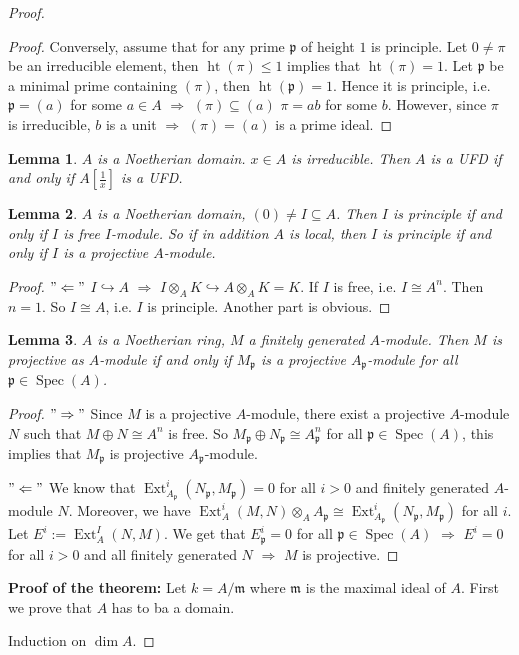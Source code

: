 \documentclass[cs4size]{article}
\newcommand{\su}{\subseteq}
\newcommand{\frm}{\mathfrak{m}}
\newcommand{\frp}{\mathfrak{p}}
\newcommand{\Ra}{\Rightarrow}
\DeclareMathOperator{\Ext}{Ext}
\DeclareMathOperator{\Spec}{Spec}
\DeclareMathOperator{\height}{ht}
\newtheorem{lem}{Lemma}
\begin{document}
\begin{proof}
\begin{proof}
Conversely, assume that for any prime $\frp$ of height $1$ is principle. Let $0\neq\pi$ be an irreducible element, then $\height(\pi)\leq 1$ implies that $\height(\pi)=1$. Let $\frp$ be a minimal prime containing $(\pi)$, then $\height(\frp)=1$. Hence it is principle, i.e. $\frp=(a)$ for some $a\in A$ $\Ra$ $(\pi)\su(a)$ $\pi=ab$ for some $b$. However, since $\pi$ is irreducible, $b$ is a unit $\Ra$ $(\pi)=(a)$ is a prime ideal.
\end{proof}
\begin{lem}\label{lem:E}
$A$ is a Noetherian domain. $x\in A$ is irreducible. Then $A$ is a UFD if and only if $A[\frac{1}{x}]$ is a UFD.
\end{lem}
\begin{lem}\label{lem:F}
$A$ is a Noetherian domain, $(0)\neq I\su A$. Then $I$ is principle if and only if $I$ is free $I$-module. So if in addition $A$ is local, then $I$ is principle if and only if $I$ is a projective $A$-module.
\end{lem}
\begin{proof}
$"\Leftarrow"$ $I\hookrightarrow A$ $\Ra$ $I\otimes_AK\hookrightarrow A\otimes_AK=K$. If $I$ is free, i.e. $I\cong A^n$. Then $n=1$. So $I\cong A$, i.e. $I$ is principle. Another part is obvious.
\end{proof}
\begin{lem}\label{lem:G}
$A$ is a Noetherian ring, $M$ a finitely generated $A$-module. Then $M$ is projective as $A$-module if and only if $M_\frp$ is a projective $A_\frp$-module for all $\frp\in \Spec(A)$.
\end{lem}
\begin{proof}
$"\Rightarrow"$ Since $M$ is a projective $A$-module, there exist a projective $A$-module $N$ such that $M\oplus N\cong A^n$ is free. So $M_\frp\oplus N_\frp\cong A_\frp^n$ for all $\frp\in \Spec(A)$, this implies that $M_\frp$ is projective $A_\frp$-module.

$"\Leftarrow"$ We know that $\Ext_{A_\frp}^i(N_\frp,M_\frp)=0$ for all $i>0$ and finitely generated $A$-module $N$. Moreover, we have $\Ext_A^i(M,N)\otimes_AA_\frp\cong \Ext_{A_\frp}^i(N_\frp,M_\frp)$ for all $i$. Let $E^i:=\Ext_A^I(N,M)$. We get that $E_\frp^i=0$ for all $\frp\in \Spec(A)$ $\Ra$ $E^i=0$ for all $i>0$ and all finitely generated $N$ $\Ra$ $M$ is projective.
\end{proof}
\textbf{Proof of the theorem:} Let $k=A/\frm$ where $\frm$ is the maximal ideal of $A$. First we prove that $A$ has to ba a domain.

Induction on $\dim A$.


\end{proof}
\end{document}

